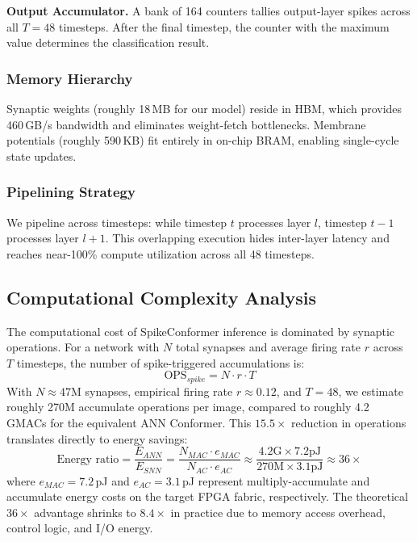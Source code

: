 \documentclass[11pt,a4paper]{article}
\begin{document}
\textbf{Output Accumulator.} A bank of 164 counters tallies output-layer spikes across all $T = 48$ timesteps. After the final timestep, the counter with the maximum value determines the classification result.

\subsubsection{Memory Hierarchy}
Synaptic weights (roughly 18\,MB for our model) reside in HBM, which provides 460\,GB/s bandwidth and eliminates weight-fetch bottlenecks. Membrane potentials (roughly 590\,KB) fit entirely in on-chip BRAM, enabling single-cycle state updates.

\subsubsection{Pipelining Strategy}
We pipeline across timesteps: while timestep $t$ processes layer $l$, timestep $t-1$ processes layer $l+1$. This overlapping execution hides inter-layer latency and reaches near-100\% compute utilization across all 48 timesteps.

\subsection{Computational Complexity Analysis}

The computational cost of SpikeConformer inference is dominated by synaptic operations. For a network with $N$ total synapses and average firing rate $r$ across $T$ timesteps, the number of spike-triggered accumulations is:
\begin{equation}
    \text{OPS}_{spike} = N \cdot r \cdot T
\end{equation}
With $N \approx 47\text{M}$ synapses, empirical firing rate $r \approx 0.12$, and $T = 48$, we estimate roughly 270M accumulate operations per image, compared to roughly 4.2 GMACs for the equivalent ANN Conformer. This $15.5\times$ reduction in operations translates directly to energy savings:
\begin{equation}
    \text{Energy ratio} = \frac{E_{ANN}}{E_{SNN}} = \frac{N_{MAC} \cdot e_{MAC}}{N_{AC} \cdot e_{AC}} \approx \frac{4.2\text{G} \times 7.2\text{pJ}}{270\text{M} \times 3.1\text{pJ}} \approx 36\times
\end{equation}
where $e_{MAC} = 7.2$\,pJ and $e_{AC} = 3.1$\,pJ represent multiply-accumulate and accumulate energy costs on the target FPGA fabric, respectively. The theoretical $36\times$ advantage shrinks to $8.4\times$ in practice due to memory access overhead, control logic, and I/O energy.
\end{document}
